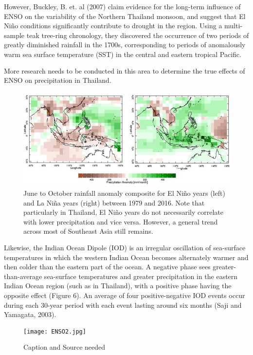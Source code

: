 However, Buckley, B. et. al (2007) claim evidence for the long-term influence of ENSO on the variability of the Northern Thailand monsoon, and suggest that El Niño conditions significantly contribute to drought in the region. Using a multi-sample teak tree-ring chronology, they discovered the occurrence of two periods of greatly diminished rainfall in the 1700s, corresponding to periods of anomalously warm sea surface temperature (SST) in the central and eastern tropical Pacific. 

More research needs to be conducted in this area to determine the true effects of ENSO on precipitation in Thailand.

\begin{figure}[htbp]
	\centering
		\includegraphics[width=1.00\textwidth]{graphics/Rainfall_Anomly_Thailand.jpg}
	\caption{June to October rainfall anomaly composite for El Niño years (left) and La Niña years (right) between 1979 and 2016. Note that particularly in Thailand, El Niño years do not necessarily correlate with lower precipitation and vice versa. However, a general trend across most of Southeast Asia still remains.}
	\label{fig:Rainfall_Anomly_Thailand}
\end{figure}

Likewise, the Indian Ocean Dipole (IOD) is an irregular oscillation of sea-surface temperatures in which the western Indian Ocean becomes alternately warmer and then colder than the eastern part of the ocean. A negative phase sees greater-than-average sea-surface temperatures and greater precipitation in the eastern Indian Ocean region (such as in Thailand), with a positive phase having the opposite effect (Figure 6). An average of four positive-negative IOD events occur during each 30-year period with each event lasting around six months (Saji and Yamagata, 2003).

\begin{figure}
	\centering
		\texttt{[image: ENSO2.jpg]}
	\caption{Caption and Source needed}
	\label{fig:ENSO2}
\end{figure}


